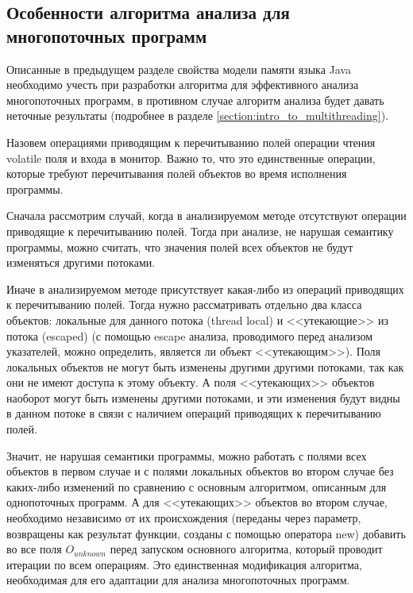 \documentclass[14pt,titlepage]{extarticle}
\newcommand{\eng}[1]{{\English#1}}
\begin{document}
    \subsection{Особенности алгоритма анализа для многопоточных программ}
      \label{section:detailed_algorithm_for_multi}

      Описанные в предыдущем разделе свойства модели памяти языка Java
      необходимо учесть при разработки алгоритма для эффективного анализа
      многопоточных программ, в противном случае алгоритм анализа будет давать
      неточные результаты (подробнее в разделе
      \ref{section:intro_to_multithreading}).

      Назовем операциями приводящим к перечитыванию полей операции чтения
      \eng{volatile} поля и входа в монитор. Важно то, что это единственные
      операции, которые требуют перечитывания полей объектов во время
      исполнения программы.

      Сначала рассмотрим случай, когда в анализируемом методе отсутствуют
      операции приводящие к перечитыванию полей. Тогда при анализе, не нарушая
      семантику программы, можно считать, что значения полей всех объектов не
      будут изменяться другими потоками.

      Иначе в анализируемом методе присутствует какая-либо из операций
      приводящих к перечитыванию полей.
      Тогда нужно рассматривать отдельно два класса объектов: локальные для
      данного потока (\eng{thread local}) и <<утекающие>> из потока
      (\eng{escaped}) (с помощью \eng{escape} анализа, проводимого перед
      анализом указателей, можно определить, является ли объект <<утекающим>>).
      Поля локальных объектов не могут быть изменены другими другими потоками,
      так как они не имеют доступа к этому объекту. А поля <<утекающих>>
      объектов наоборот могут быть изменены другими потоками, и эти изменения
      будут видны в данном потоке в связи с наличием операций приводящих к
      перечитыванию полей.

      Значит, не нарушая семантики программы, можно работать с полями всех
      объектов в первом случае и с полями локальных объектов во втором случае
      без каких-либо изменений по сравнению с основным алгоритмом, описанным
      для однопоточных программ.
      А для <<утекающих>> объектов во втором случае, необходимо независимо от
      их происхождения (переданы через параметр, возвращены как результат
      функции, созданы с помощью оператора new) добавить во все поля
      $O_{unknown}$ перед запуском основного алгоритма, который проводит
      итерации по всем операциям.
      Это единственная модификация алгоритма, необходимая для его адаптации для
      анализа многопоточных программ.
\end{document}

